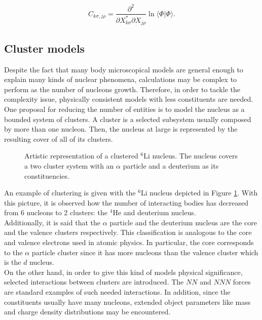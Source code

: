 \documentclass[openany]{book}
\begin{document}
\begin{equation}\label{eq:micro_AMD_timeDependent_constants}
	C_{k\sigma, j\rho} = \frac{\partial^2}{\partial X_{k\sigma}^{*} \partial X_{j\rho}} \ln {\langle \Phi | \Phi \rangle }.
\end{equation}


\subsection{Cluster models} \label{sub:microscopical_cluster}

Despite the fact that many body microscopical models are general enough to explain many kinds of nuclear phenomena, calculations may be complex to perform as the number of nucleons growth. Therefore, in order to tackle the complexity issue, physically consistent models with less constituents are needed. \\

One proposal for reducing the number of entities is to model the nucleus as a bounded system of clusters. A cluster is a selected subsystem usually composed by more than one nucleon. Then, the nucleus at large is represented by the resulting cover of all of its clusters.   \\

\begin{figure}[H]
	
	\caption[Clustered $\mathrm{{}^{6}Li}$ nucleus]{Artistic representation of a clustered $\mathrm{{}^{6}Li}$ nucleus. The nucleus covers a two cluster system with an $\alpha$ particle and a deuterium as its constituencies.  }
	\label{fig:microscopical_cluster}
\end{figure}


An example of clustering is given with the $\mathrm{{}^{6}Li}$ nucleus depicted in Figure \ref{fig:microscopical_cluster}. With this picture, it is observed how the number of interacting bodies has decreased from 6 nucleons to 2 clusters: the  $\mathrm{{}^{4}He}$ and deuterium nucleus.  \\

Additionally, it is said that the $\alpha$ particle and the deuterium nucleus are the core and the valence clusters respectively. This classification is analogous to the core and valence electrons used in atomic physics. In particular, the core corresponds to the $\alpha$ particle cluster since it has more nucleons than the valence cluster which is the $d$ nucleus.  \\

On the other hand, in order to give this kind of models physical significance, selected interactions between clusters are introduced. The $NN$ and $NNN$ forces are standard examples of such needed interactions. In addition, since the constituents usually have many nucleons, extended object parameters like mass and charge density distributions may be encountered. \\
\end{document}
